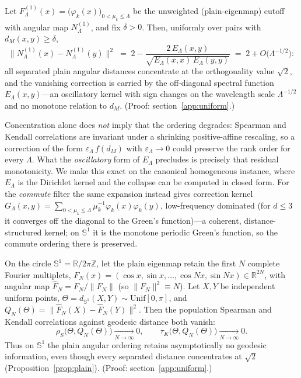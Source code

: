 \documentclass[review]{siamart220329}
\begin{document}
\begin{proposition}\label{prop:plain}
Let $F^{(1)}_\Lambda(x)=\big(\varphi_k(x)\big)_{0<\mu_k\le\Lambda}$ be the
unweighted (plain-eigenmap) cutoff with angular map $N^{(1)}_\Lambda$, and fix
$\delta>0$. Then, uniformly over pairs with $d_M(x,y)\ge\delta$,
\[
\big\lVert N^{(1)}_\Lambda(x)-N^{(1)}_\Lambda(y)\big\rVert^{2}
\;=\;2-\frac{2\,E_\Lambda(x,y)}{\sqrt{E_\Lambda(x,x)\,E_\Lambda(y,y)}}
\;=\;2+O\big(\Lambda^{-1/2}\big):
\]
all separated plain angular distances concentrate at the orthogonality value
$\sqrt2$, and the vanishing correction is carried by the off-diagonal spectral
function $E_\Lambda(x,y)$---an oscillatory kernel with sign changes on the
wavelength scale $\Lambda^{-1/2}$ and no monotone relation to $d_M$. (Proof:
section~\ref{app:uniform}.)
\end{proposition}

\noindent Concentration alone does \emph{not} imply that the ordering degrades:
Spearman and Kendall correlations are invariant under a shrinking positive-affine
rescaling, so a correction of the form $\varepsilon_\Lambda\,f(d_M)$ with
$\varepsilon_\Lambda\to0$ could preserve the rank order for every $\Lambda$. What
the \emph{oscillatory} form of $E_\Lambda$ precludes is precisely that residual
monotonicity. We make this exact on the canonical homogeneous instance, where
$E_\Lambda$ is the Dirichlet kernel and the collapse can be computed in closed
form. For the \emph{commute} filter the same expansion instead gives correction
kernel $G_\Lambda(x,y)=\sum_{0<\mu_k\le\Lambda}\mu_k^{-1}\varphi_k(x)\varphi_k(y)$,
low-frequency dominated (for $d\le3$ it converges off the diagonal to the Green's
function)---a coherent, distance-structured kernel; on $\mathbb S^1$ it is the
monotone periodic Green's function, so the commute ordering there is preserved.

\begin{theorem}\label{thm:s1collapse}
On the circle $\mathbb S^1=\mathbb R/2\pi\mathbb Z$, let the plain eigenmap retain
the first $N$ complete Fourier multiplets,
$F_N(x)=(\cos x,\sin x,\dots,\cos Nx,\sin Nx)\in\mathbb R^{2N}$, with angular map
$\widehat F_N=F_N/\lVert F_N\rVert$ (so $\lVert F_N\rVert^2\equiv N$). Let $X,Y$ be
independent uniform points, $\Theta=d_{\mathbb S^1}(X,Y)\sim\mathrm{Unif}[0,\pi]$,
and $Q_N(\Theta)=\lVert\widehat F_N(X)-\widehat F_N(Y)\rVert^2$. Then the population
Spearman and Kendall correlations against geodesic distance both vanish:
\[
\rho_S\big(\Theta,Q_N(\Theta)\big)\xrightarrow[N\to\infty]{}0,
\qquad
\tau_K\big(\Theta,Q_N(\Theta)\big)\xrightarrow[N\to\infty]{}0 .
\]
Thus on $\mathbb S^1$ the plain angular ordering retains asymptotically no
geodesic information, even though every separated distance concentrates at
$\sqrt2$ (Proposition~\ref{prop:plain}). (Proof: section~\ref{app:uniform}.)
\end{theorem}
\end{document}
